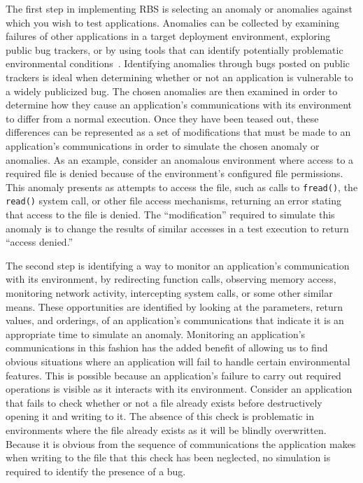 The first step in implementing RBS
is selecting an anomaly or anomalies
against which you wish to test applications.
Anomalies can be collected
by examining failures of other applications
in a target deployment environment,
exploring public bug trackers,
or by using tools that can identify
potentially problematic environmental conditions~\cite{Zhuang_NSDI_2014,
rasley2015detecting}.
Identifying anomalies through bugs posted on public trackers
is ideal when determining
whether or not an application
is vulnerable to a widely publicized bug.
The chosen anomalies are then examined
in order to determine how they cause an application's communications
with its environment
to differ from a normal execution.
Once they have been teased out,
these differences can be represented
as a set of modifications
that must be made to an application's communications
in order to simulate the chosen anomaly or anomalies.
As an example,
consider an anomalous environment
where access to a required file is denied because of
the environment's configured file permissions.
This anomaly presents as attempts to access the file,
such as calls to {\tt fread()},
the {\tt read()} system call,
or other file access mechanisms,
returning an error stating that access to the file is denied.
The ``modification'' required to simulate this anomaly
is to change the results of similar accesses
in a test execution
to return ``access denied.''

The second step
is identifying
a way to monitor an application's communication
with its environment,
by redirecting function calls,
observing memory access,
monitoring network activity,
intercepting system calls,
or some other similar means.
These opportunities are identified by looking at the parameters,
return values,
and orderings,
of an application's communications
that indicate
it is an appropriate time to simulate an anomaly.
Monitoring an application's communications
in this fashion
has the added benefit
of allowing us to find obvious situations
where an application will fail
to handle certain environmental features.
This is possible because an application's failure
to carry out required operations is visible as it interacts
with its environment.
Consider an application that fails to check whether or not
a file already exists
before destructively opening it and writing to it.
The absence of this check
is problematic in environments where the file already exists
as it will be blindly overwritten.
Because it is obvious from the sequence of communications
the application makes when writing to the file
that this check has been neglected,
no simulation is required to identify the presence of a bug.

